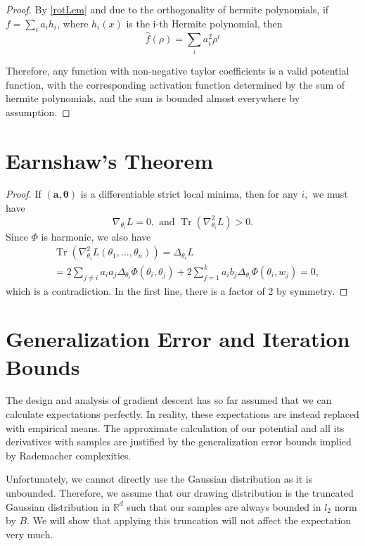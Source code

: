 \documentclass{article}
\newcommand{\R}{{\mathbb{R}}}
\DeclareMathOperator{\Tr}{Tr}
\begin{document}
\rotReal*

\begin{proof}
By \ref{rotLem} and due to the orthogonality of hermite polynomials, if $f = \sum_i a_i h_i$, where $h_i(x)$ is the i-th Hermite polynomial, then
%
\[\widehat{f}(\rho) = \sum_{i} a_i^2 \rho^i\]

Therefore, any function with non-negative taylor coefficients is a valid potential function, with the corresponding activation function determined by the sum of hermite polynomials, and the sum is bounded almost everywhere by assumption.
\end{proof}

\section{Earnshaw's Theorem}

\earnshaw*
\begin{proof}
  If $(\boldsymbol{a,\theta})$ is a differentiable strict local
  minima, then for any $i,$ we must have
\[\nabla_{\theta_{i}} L = 0, \text{ and }  \Tr(\nabla^2_{\theta_i}L) > 0.\]
Since $\Phi$ is harmonic, we also have
\begin{align*}
&  \Tr(\nabla^2_{\theta_i}L(\theta_1,...,\theta_n)) = \Delta_{\theta_i} L \\
&  =  2\sum_{ j\neq i} a_ia_j \Delta_{\theta_i}\Phi(\theta_i,\theta_j)
  + 2\sum_{j=1}^ka_ib_j  \Delta_{\theta_i}\Phi(\theta_i,w_j) = 0,
\end{align*}
which is a contradiction. In the first line, there is a factor of 2 by symmetry.
\end{proof}

\section{Generalization Error and Iteration Bounds}
\label{finite}
 
The design and analysis of gradient descent has so far assumed that we can calculate expectations perfectly. In reality, these expectations are instead replaced with empirical means. The approximate calculation of our potential and all its derivatives with samples are justified by the generalization error bounds implied by Rademacher complexities. 

Unfortunately, we cannot directly use the Gaussian distribution as it is unbounded. Therefore, we assume that our drawing distribution is the truncated Gaussian distribution in $\R^d$ such that our samples are always bounded in $l_2$ norm by $B$. We will show that applying this truncation will not affect the expectation very much. 
\end{document}
